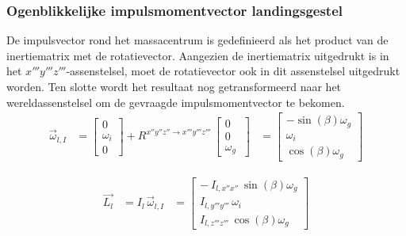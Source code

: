 \subsubsection{Ogenblikkelijke impulsmomentvector landingsgestel}
De impulsvector rond het massacentrum is gedefinieerd als het product van de inertiematrix met de rotatievector. Aangezien de inertiematrix uitgedrukt is in het $x'''y'''z'''$-assenstelsel, moet de rotatievector ook in dit assenstelsel uitgedrukt worden. 
Ten slotte wordt het resultaat nog getransformeerd naar het wereldassenstelsel om de gevraagde impulsmomentvector te bekomen.
\begin{equation*}
\begin{split}
\overrightarrow{\omega}_{l,I}
&=\begin{bmatrix}
0\\
\omega_{i}\\
0\
\end{bmatrix}
+R^{x''y''z'' \rightarrow x'''y'''z'''}\,
\begin{bmatrix}
0\\
0\\
\omega_{g}\
\end{bmatrix}
&=\begin{bmatrix}
-\sin \left( \beta \right) \omega_{g}
\\
\omega_{i}\\
\cos \left( \beta
 \right) \omega_{g}\
\end{bmatrix}
\end{split}
\end{equation*}

\begin{equation}
\begin{split}
\overrightarrow{L_{l}}&=I_{l}\,\overrightarrow{\omega}_{l,I}&=
\begin{bmatrix}
-{\ I_{l,x''x''}}\,\sin \left( \beta \right) 
\omega_{g}\\
{ I_{l,y'''y'''}}\,\omega_{i}
\\
{I_{l,z'''z'''}}\,\cos \left( \beta \right) \omega_
{g}\
\end{bmatrix}
\end{split}
\end{equation}

